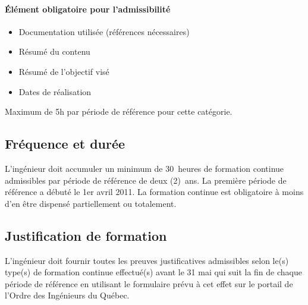 		\paragraph{Élément obligatoire pour l’admissibilité}
		\begin{itemize}
			\item Documentation utilisée (références nécessaires)
			\item Résumé du contenu
			\item Résumé de l’objectif visé
			\item Dates de réalisation
		\end{itemize}

		Maximum de 5h par période de référence pour cette catégorie. 		
		
	\subsection{Fréquence et durée}
	L’ingénieur doit accumuler un minimum de 30~heures de formation continue admissibles par période de référence de deux (2)~ans. La première période de référence a débuté le 1er avril 2011. La formation continue est obligatoire à moins d’en être dispensé partiellement ou totalement.
	
	\subsection{Justification de formation}
	L’ingénieur doit fournir toutes les preuves justificatives admissibles selon le(s) type(s) de formation continue effectué(s) avant le 31 mai qui suit la fin de chaque période de référence en utilisant le formulaire prévu à cet effet sur le portail de l’Ordre des Ingénieurs du Québec.
